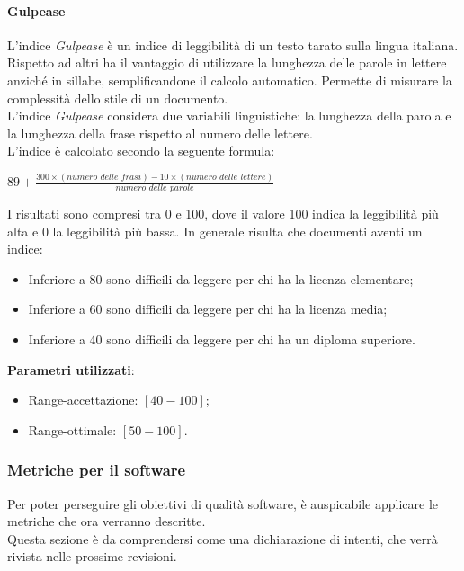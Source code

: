 \paragraph{Gulpease}
L'indice \textit{Gulpease} è un indice di leggibilità di un testo tarato sulla lingua italiana.\\
Rispetto ad altri ha il vantaggio di utilizzare la lunghezza delle parole in lettere anziché in sillabe, semplificandone il calcolo automatico. Permette di misurare la complessità dello stile di un documento.\\
L'indice \textit{Gulpease} considera due variabili linguistiche: la lunghezza della parola e la lunghezza della frase rispetto al numero delle lettere.\\
L'indice è calcolato secondo la seguente formula:
\begin{center}
$89+\frac{300\times(\textit{numero delle frasi})-10\times(\textit{numero delle lettere})}{\textit{numero delle parole}}$
\end{center}
I risultati sono compresi tra 0 e 100, dove il valore 100 indica la leggibilità più alta e 0 la leggibilità più bassa. In generale risulta che documenti aventi un indice:
\begin{itemize}
\item Inferiore a 80 sono difficili da leggere per chi ha la licenza elementare;
\item Inferiore a 60 sono difficili da leggere per chi ha la licenza media;
\item Inferiore a 40 sono difficili da leggere per chi ha un diploma superiore.
\end{itemize}
\textbf{Parametri utilizzati}:
\begin{itemize}
\item Range-accettazione: $[40-100]$;
\item Range-ottimale: $[50-100]$.
\end{itemize}

\subsubsection{Metriche per il software}
Per poter perseguire gli obiettivi di qualità software, è auspicabile applicare le metriche che ora verranno descritte.\\
Questa sezione è da comprendersi come una dichiarazione di intenti, che verrà rivista nelle prossime revisioni.

